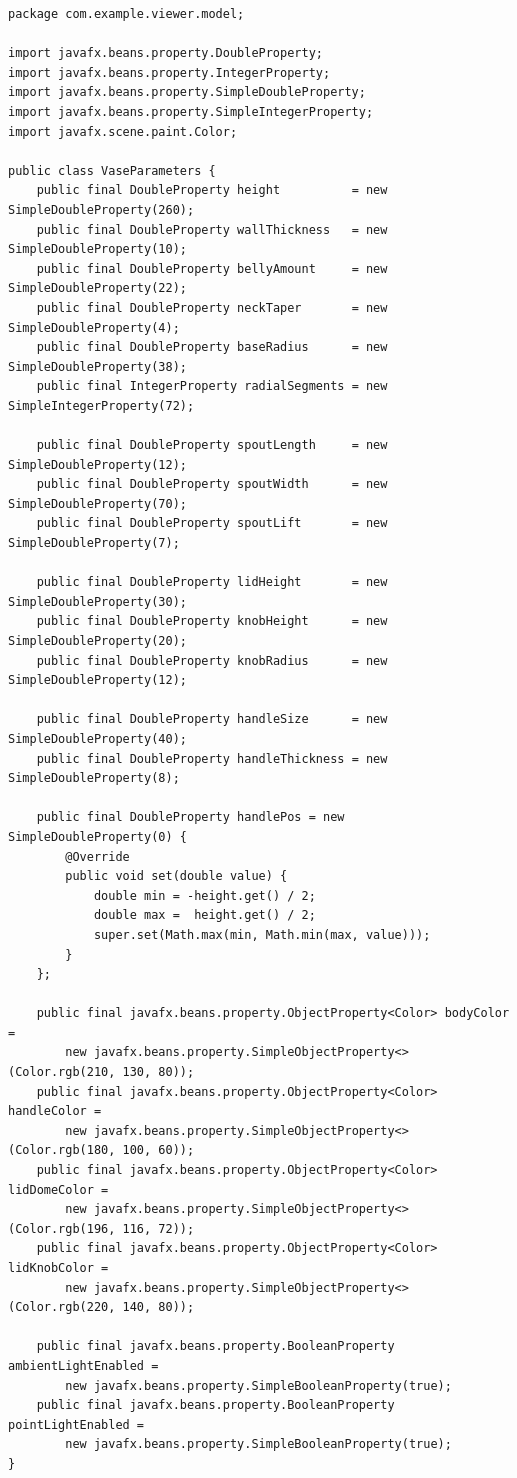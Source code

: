 \documentclass[12pt,a4paper]{article}
\begin{document}
\begin{lstlisting}[style=java, caption={VaseParameters.java -- adatmodell}]
package com.example.viewer.model;

import javafx.beans.property.DoubleProperty;
import javafx.beans.property.IntegerProperty;
import javafx.beans.property.SimpleDoubleProperty;
import javafx.beans.property.SimpleIntegerProperty;
import javafx.scene.paint.Color;

public class VaseParameters {
    public final DoubleProperty height          = new SimpleDoubleProperty(260);
    public final DoubleProperty wallThickness   = new SimpleDoubleProperty(10);
    public final DoubleProperty bellyAmount     = new SimpleDoubleProperty(22);
    public final DoubleProperty neckTaper       = new SimpleDoubleProperty(4);
    public final DoubleProperty baseRadius      = new SimpleDoubleProperty(38);
    public final IntegerProperty radialSegments = new SimpleIntegerProperty(72);

    public final DoubleProperty spoutLength     = new SimpleDoubleProperty(12);
    public final DoubleProperty spoutWidth      = new SimpleDoubleProperty(70);
    public final DoubleProperty spoutLift       = new SimpleDoubleProperty(7);

    public final DoubleProperty lidHeight       = new SimpleDoubleProperty(30);
    public final DoubleProperty knobHeight      = new SimpleDoubleProperty(20);
    public final DoubleProperty knobRadius      = new SimpleDoubleProperty(12);

    public final DoubleProperty handleSize      = new SimpleDoubleProperty(40);
    public final DoubleProperty handleThickness = new SimpleDoubleProperty(8);

    public final DoubleProperty handlePos = new SimpleDoubleProperty(0) {
        @Override
        public void set(double value) {
            double min = -height.get() / 2;
            double max =  height.get() / 2;
            super.set(Math.max(min, Math.min(max, value)));
        }
    };

    public final javafx.beans.property.ObjectProperty<Color> bodyColor =
        new javafx.beans.property.SimpleObjectProperty<>(Color.rgb(210, 130, 80));
    public final javafx.beans.property.ObjectProperty<Color> handleColor =
        new javafx.beans.property.SimpleObjectProperty<>(Color.rgb(180, 100, 60));
    public final javafx.beans.property.ObjectProperty<Color> lidDomeColor =
        new javafx.beans.property.SimpleObjectProperty<>(Color.rgb(196, 116, 72));
    public final javafx.beans.property.ObjectProperty<Color> lidKnobColor =
        new javafx.beans.property.SimpleObjectProperty<>(Color.rgb(220, 140, 80));

    public final javafx.beans.property.BooleanProperty ambientLightEnabled =
        new javafx.beans.property.SimpleBooleanProperty(true);
    public final javafx.beans.property.BooleanProperty pointLightEnabled =
        new javafx.beans.property.SimpleBooleanProperty(true);
}
\end{lstlisting}
\end{document}

